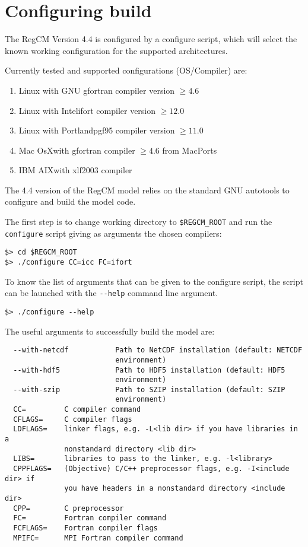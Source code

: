 \section{Configuring build}

The RegCM Version 4.4 is configured by a configure script, which will select
the known working configuration for the supported architectures.

Currently tested and supported configurations (OS/Compiler) are:

\begin{enumerate}
\item Linux with GNU gfortran compiler version $\ge 4.6$
\item Linux with Intel\texttrademark ifort compiler version $\ge 12.0$
\item Linux with Portland\texttrademark pgf95 compiler version $\ge 11.0$
\item Mac OsX\texttrademark with gfortran compiler $\ge 4.6$ from MacPorts
\item IBM AIX\texttrademark with xlf2003 compiler
\end{enumerate}

The 4.4 version of the RegCM model relies on the standard GNU autotools to
configure and build the model code.

The first step is to change working directory to \verb=$REGCM_ROOT= and run the
\verb=configure= script giving as arguments the chosen compilers:

\begin{Verbatim}
$> cd $REGCM_ROOT
$> ./configure CC=icc FC=ifort
\end{Verbatim}

To know the list of arguments that can be given to the configure script, the
script can be launched with the \verb=--help= command line argument.

\begin{Verbatim}
$> ./configure --help
\end{Verbatim}

The useful arguments to successfully build the model are:

\begin{Verbatim}
  --with-netcdf           Path to NetCDF installation (default: NETCDF
                          environment)
  --with-hdf5             Path to HDF5 installation (default: HDF5
                          environment)
  --with-szip             Path to SZIP installation (default: SZIP
                          environment)
  CC=         C compiler command
  CFLAGS=     C compiler flags
  LDFLAGS=    linker flags, e.g. -L<lib dir> if you have libraries in a
              nonstandard directory <lib dir>
  LIBS=       libraries to pass to the linker, e.g. -l<library>
  CPPFLAGS=   (Objective) C/C++ preprocessor flags, e.g. -I<include dir> if
              you have headers in a nonstandard directory <include dir>
  CPP=        C preprocessor
  FC=         Fortran compiler command
  FCFLAGS=    Fortran compiler flags
  MPIFC=      MPI Fortran compiler command
\end{Verbatim}

